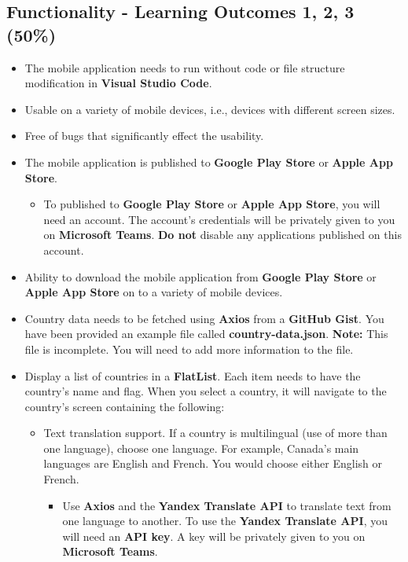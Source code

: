 \documentclass{article}
\begin{document}
\subsection*{Functionality - Learning Outcomes 1, 2, 3 (50\%)}
\begin{itemize}
	\item The mobile application needs to run without code or file structure modification in \textbf{Visual Studio Code}.
	\item Usable on a variety of mobile devices, i.e., devices with different screen sizes.
	\item Free of bugs that significantly effect the usability.
	\item The mobile application is published to \textbf{Google Play Store} or \textbf{Apple App Store}.
	\begin{itemize}
		\item To published to \textbf{Google Play Store} or \textbf{Apple App Store}, you will need an account. The account's credentials will be privately given to you on \textbf{Microsoft Teams}. \textbf{Do not} disable any applications published on this account.
	\end{itemize}
	\item Ability to download the mobile application from \textbf{Google Play Store} or \textbf{Apple App Store} on to a variety of mobile devices.
	\item Country data needs to be fetched using \textbf{Axios} from a \textbf{GitHub Gist}. You have been provided an example file called \textbf{country-data.json}. \textbf{Note:} This file is incomplete. You will need to add more information to the file. 
	\item Display a list of countries in a \textbf{FlatList}. Each item needs to have the country's name and flag. When you select a country, it will navigate to the country's screen containing the following:
	\begin{itemize}
		\item Text translation support. If a country is multilingual (use of more than one language), choose one language. For example, Canada's main languages are English and French. You would choose either English or French.
		\begin{itemize}
			\item Use \textbf{Axios} and the \textbf{Yandex Translate API} to translate text from one language to another. To use the \textbf{Yandex Translate API}, you will need an \textbf{API key}. A key will be privately given to you on \textbf{Microsoft Teams}.

\end{itemize}
\end{itemize}
\end{itemize}
\end{document}
